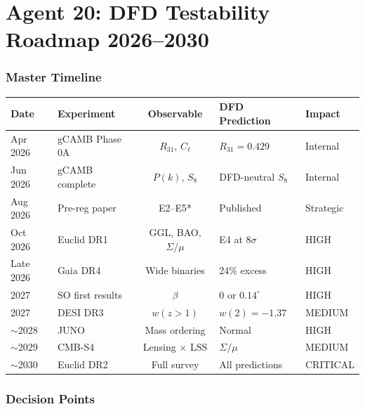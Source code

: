 \documentclass[11pt,a4paper]{article}
\begin{document}
\part{Agent 20: DFD Testability Roadmap 2026--2030}
\label{part:roadmap}

\section{Master Timeline}

\begin{center}
\begin{longtable}{llcll}
\toprule
\textbf{Date} & \textbf{Experiment} & \textbf{Observable} & \textbf{DFD Prediction} & \textbf{Impact} \\
\midrule
Apr 2026 & gCAMB Phase 0A & $R_{31}$, $C_\ell$ & $R_{31} = 0.429$ & Internal \\
Jun 2026 & gCAMB complete & $P(k)$, $S_8$ & DFD-neutral $S_8$ & Internal \\
Aug 2026 & Pre-reg paper & E2--E5* & Published & Strategic \\
Oct 2026 & Euclid DR1 & GGL, BAO, $\Sigma/\mu$ & E4 at $8\sigma$ & HIGH \\
Late 2026 & Gaia DR4 & Wide binaries & 24\% excess & HIGH \\
2027 & SO first results & $\beta$ & $0$ or $0.14^\circ$ & HIGH \\
2027 & DESI DR3 & $w(z > 1)$ & $w(2) = -1.37$ & MEDIUM \\
$\sim$2028 & JUNO & Mass ordering & Normal & HIGH \\
$\sim$2029 & CMB-S4 & Lensing $\times$ LSS & $\Sigma/\mu$ & MEDIUM \\
$\sim$2030 & Euclid DR2 & Full survey & All predictions & CRITICAL \\
\bottomrule
\end{longtable}
\end{center}

\section{Decision Points}
\end{document}

